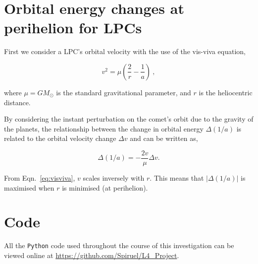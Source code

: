 \clearpage
\section*{Orbital energy changes at perihelion for LPCs}

First we consider a LPC's orbital velocity with the use of the vis-viva equation,

\begin{equation}
    v^2 = \mu \left( \dfrac{2}{r} - \dfrac{1}{a} \right)~,
    \label{eq:visviva}
\end{equation}

where $\mu=GM_\odot$ is the standard gravitational parameter, and $r$ is the heliocentric distance.

By considering the instant perturbation on the comet's orbit due to the gravity of the planets, the relationship between the change in orbital energy $\Delta(1/a)$ is related to the orbital velocity change $\Delta v$ and can be written as,

\begin{equation}
    \Delta(1/a) = -\dfrac{2v}{\mu} \Delta v.
\end{equation}

From Eqn.~\ref{eq:visviva}, $v$ scales inversely with $r$. This means that $| \Delta (1/a) |$ is maximised when $r$ is minimised (at perihelion).

\section*{Code}

All the \texttt{Python} code used throughout the course of this investigation can be viewed online at \url{https://github.com/Spiruel/L4_Project}.